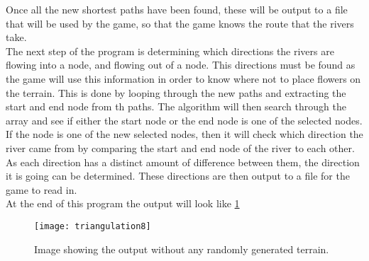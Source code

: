 	Once all the new shortest paths have been found, these will be output to a file that will be used by the game, so that the game knows the route that the rivers take.\\
	The next step of the program is determining which directions the rivers are flowing into a node, and flowing out of a node. This directions must be found as the game will use this information in order to know where not to place flowers on the terrain. This is done by looping through the new paths and extracting the start and end node from th paths. The algorithm will then search through the array and see if either the start node or the end node is one of the selected nodes. If the node is one of the new selected nodes, then it will check which direction the river came from by comparing the start and end node of the river to each other. As each direction has a distinct amount of difference between them, the direction it is going can be determined. These directions are then output to a file for the game to read in.\\
	At the end of this program the output will look like \ref{fig:triangulation8}

\newpage

\begin{figure}[H]
	\texttt{[image: triangulation8]}
	\centering
	\caption{Image showing the output without any randomly generated terrain.}
	\label{fig:triangulation8}
\end{figure}

